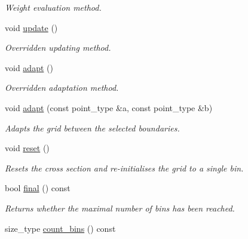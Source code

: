 \begin{DoxyCompactItemize}
\begin{DoxyCompactList}\small\item\em Weight evaluation method. \end{DoxyCompactList}\item 
\hypertarget{a00385_a4e00d9cd734dc325a90e4b1c3a809cb7}{void \hyperlink{a00385_a4e00d9cd734dc325a90e4b1c3a809cb7}{update} ()}\label{a00385_a4e00d9cd734dc325a90e4b1c3a809cb7}

\begin{DoxyCompactList}\small\item\em Overridden updating method. \end{DoxyCompactList}\item 
\hypertarget{a00385_a02e435069a682019849eca515dcc1d84}{void \hyperlink{a00385_a02e435069a682019849eca515dcc1d84}{adapt} ()}\label{a00385_a02e435069a682019849eca515dcc1d84}

\begin{DoxyCompactList}\small\item\em Overridden adaptation method. \end{DoxyCompactList}\item 
\hypertarget{a00385_a2cee7cb79b7c063bab36b94ae1d95fba}{void \hyperlink{a00385_a2cee7cb79b7c063bab36b94ae1d95fba}{adapt} (const point\-\_\-type \&a, const point\-\_\-type \&b)}\label{a00385_a2cee7cb79b7c063bab36b94ae1d95fba}

\begin{DoxyCompactList}\small\item\em Adapts the grid between the selected boundaries. \end{DoxyCompactList}\item 
void \hyperlink{a00385_a35113663cb802ce279584b6ee5c6d5c5}{reset} ()
\begin{DoxyCompactList}\small\item\em Resets the cross section and re-\/initialises the grid to a single bin. \end{DoxyCompactList}\item 
\hypertarget{a00385_a0ecbb32e8ac09fe88291e4a4c45be738}{bool \hyperlink{a00385_a0ecbb32e8ac09fe88291e4a4c45be738}{final} () const }\label{a00385_a0ecbb32e8ac09fe88291e4a4c45be738}

\begin{DoxyCompactList}\small\item\em Returns whether the maximal number of bins has been reached. \end{DoxyCompactList}\item 
\hypertarget{a00385_afb807f1bed94f20d2d00a10b2e461b06}{size\-\_\-type \hyperlink{a00385_afb807f1bed94f20d2d00a10b2e461b06}{count\-\_\-bins} () const }\label{a00385_afb807f1bed94f20d2d00a10b2e461b06}


\end{DoxyCompactItemize}
